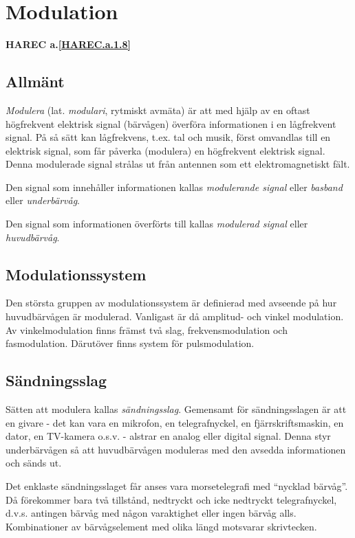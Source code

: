\section{Modulation}
\textbf{HAREC a.\ref{HAREC.a.1.8}\label{myHAREC.a.1.8}}
\label{modulation}

\subsection{Allmänt}

\emph{Modulera} (lat. \emph{modulari}, rytmiskt avmäta) är att med hjälp av en
oftast högfrekvent elektrisk signal (bärvågen) överföra informationen i en
lågfrekvent signal. På så sätt kan lågfrekvens, t.ex. tal och musik, först
omvandlas till en elektrisk signal, som får påverka (modulera) en högfrekvent
elektrisk signal. Denna modulerade signal strålas ut från antennen som ett
elektromagnetiskt fält.

Den signal som innehåller informationen kallas \emph{modulerande signal} eller
\emph{basband} eller \emph{underbärvåg}.

Den signal som informationen överförts till kallas \emph{modulerad signal}
eller \emph{huvudbärvåg}.

\subsection{Modulationssystem}

Den största gruppen av modulationssystem är definierad med avseende på hur
huvudbärvågen är modulerad. Vanligast är då amplitud- och vinkel modulation.
Av vinkelmodulation finns främst två slag, frekvensmodulation och
fasmodulation. Därutöver finns system för pulsmodulation.

\subsection{Sändningsslag}

Sätten att modulera kallas \emph{sändningsslag}. Gemensamt för sändningsslagen
är att en givare - det kan vara en mikrofon, en telegrafnyckel, en
fjärrskriftsmaskin, en dator, en TV-kamera o.s.v. - alstrar en analog eller
digital signal. Denna styr underbärvågen så att huvudbärvågen moduleras med den
avsedda informationen och sänds ut.

Det enklaste sändningsslaget får anses vara morsetelegrafi med ``nycklad bärvåg''.
Då förekommer bara två tillstånd, nedtryckt och icke nedtryckt telegrafnyckel,
d.v.s. antingen bärvåg med någon varaktighet eller ingen bärvåg alls.
Kombinationer av bärvågselement med olika längd motsvarar skrivtecken.

